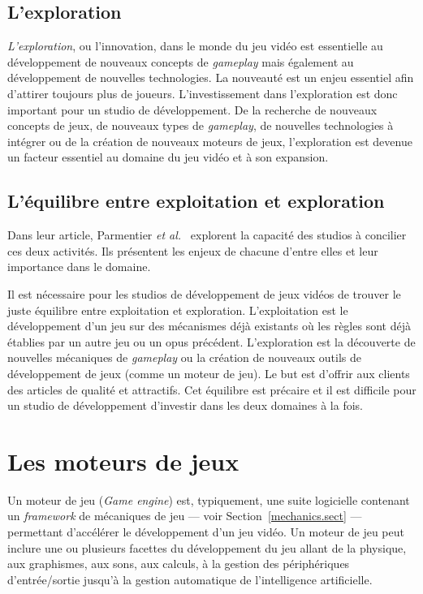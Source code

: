 \subsection{L'exploration}
\emph{L'exploration}, ou l'innovation, dans le monde du jeu vidéo est essentielle au développement de nouveaux concepts de \emph{gameplay} mais également au développement de nouvelles technologies.
La nouveauté est un enjeu essentiel afin d'attirer toujours plus de joueurs.
L'investissement dans l'exploration est donc important pour un studio de développement.
De la recherche de nouveaux concepts de jeux, de nouveaux types de \emph{gameplay}, de nouvelles technologies à intégrer ou de la création de nouveaux moteurs de jeux, l'exploration est devenue un facteur essentiel au domaine du jeu vidéo et à son expansion.


\subsection{L'équilibre entre exploitation et exploration}
Dans leur article, Parmentier \emph{et al.}~\cite{ParmentierGuy2009Iecd} explorent la capacité des studios à concilier ces deux activités.
Ils présentent les enjeux de chacune d'entre elles et leur importance dans le domaine.

Il est nécessaire pour les studios de développement de jeux vidéos de trouver le juste équilibre entre exploitation et exploration.
L'exploitation est le développement d'un jeu sur des mécanismes déjà existants où les règles sont déjà établies par un autre jeu ou un opus précédent.
L'exploration est la découverte de nouvelles mécaniques de \emph{gameplay} ou la création de nouveaux outils de développement de jeux (comme un moteur de jeu).
Le but est d'offrir aux clients des articles de qualité et attractifs.
Cet équilibre est précaire et il est difficile pour un studio de développement d'investir dans les deux domaines à la fois. 



\section{Les moteurs de jeux}
Un moteur de jeu (\emph{Game engine}) est, typiquement, une suite logicielle contenant un \emph{framework} de mécaniques de jeu --- voir Section~\ref{mechanics.sect} --- permettant d'accélérer le développement d'un jeu vidéo.
Un moteur de jeu peut inclure une ou plusieurs facettes du développement du jeu allant de la physique, aux graphismes, aux sons, aux calculs, à la gestion des périphériques d'entrée/sortie jusqu'à la gestion automatique de l'intelligence artificielle.


